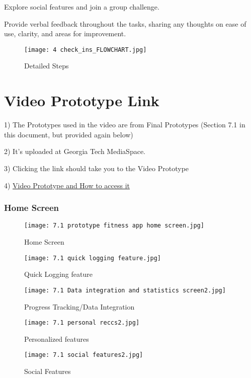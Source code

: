\documentclass[
	letterpaper, %
]{jdf}
\begin{document}
Explore social features and join a group challenge.

Provide verbal feedback throughout the tasks, sharing any thoughts on ease of use, clarity, and areas for improvement.

\begin{figure}
    \centering
    \texttt{[image: 4 check\_ins\_FLOWCHART.jpg]}
    \caption{Detailed Steps}
    \label{fig:enter-label}
\end{figure}

\newpage
\section{Video Prototype Link}
1) The Prototypes used in the video are from Final Prototypes (Section 7.1 in this document, but provided again below)

2) It's uploaded at Georgia Tech MediaSpace. 

3) Clicking the link should take you to the Video Prototype 

4) \href{https://mediaspace.gatech.edu/media/Video+Prototype+for+HCI+Final+Project%2C+Spring+2025/1_o8th4jxo}{\underline{Video Prototype and How to access it}}
\hfill


\subsubsection{Home Screen}
\begin{figure}
    \centering
    \texttt{[image: 7.1 prototype fitness app home screen.jpg]}
    \caption{Home Screen}
    \label{fig:enter-label}
\end{figure}
\hfill


\begin{figure}
    \centering
    \texttt{[image: 7.1 quick logging feature.jpg]}
    \caption{Quick Logging feature}
    \label{fig:enter-label}
\end{figure}


\begin{figure}
    \centering
    \texttt{[image: 7.1 Data integration and statistics screen2.jpg]}
    \caption{Progress Tracking/Data Integration}
    \label{fig:enter-label}
\end{figure}

\begin{figure}
    \centering
    \texttt{[image: 7.1 personal reccs2.jpg]}
    \caption{Personalized features}
    \label{fig:enter-label}
\end{figure}


\begin{figure}
    \centering
    \texttt{[image: 7.1 social features2.jpg]}
    \caption{Social Features}
    \label{fig:enter-label}
\end{figure}
\end{document}
